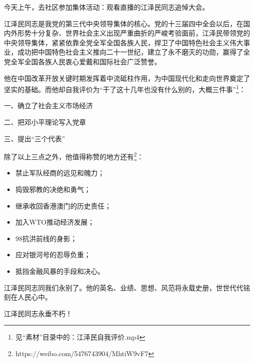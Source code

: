 今天上午，去社区参加集体活动：观看直播的江泽民同志追悼大会。

江泽民同志是我党的第三代中央领导集体的核心。党的十三届四中全会以后，在国内外形势十分复杂、世界社会主义出现严重曲折的严峻考验面前，江泽民带领党的中央领导集体，紧紧依靠全党全军全国各族人民，捍卫了中国特色社会主义伟大事业，成功把中国特色社会主义推向二十一世纪，建立了永不磨灭的功勋，赢得了全党全军全国各族人民衷心爱戴和国际社会广泛赞誉。

他在中国改革开放关键时期发挥着中流砥柱作用，为中国现代化和走向世界奠定了坚实的基础。而他却自我评价为“干了这十几年也没有什么别的，大概三件事”\footnote{见“素材”目录中的：江泽民自我评价.mp4}：

一、确立了社会主义市场经济

二、把邓小平理论写入党章

三、提出“三个代表”

除了以上三点之外，他值得称赞的地方还有\footnote{https://weibo.com/5476743904/MhtiW9vF7}：

\begin{itemize}[nosep, left=\parindent]
    \item 禁止军队经商的远见和魄力；
    \item 捣毁邪教的决绝和勇气；
    \item 继承收回香港澳门的历史责任；
    \item 加入WTO推动经济发展；
    \item 98抗洪前线的身影；
    \item 应对银河号的忍辱负重；
    \item 抵挡金融风暴的手段和决心。
\end{itemize}

江泽民同志同我们永别了。他的英名、业绩、思想、风范将永载史册，世世代代铭刻在人民心中。

\centering\Huge 江泽民同志永垂不朽！
